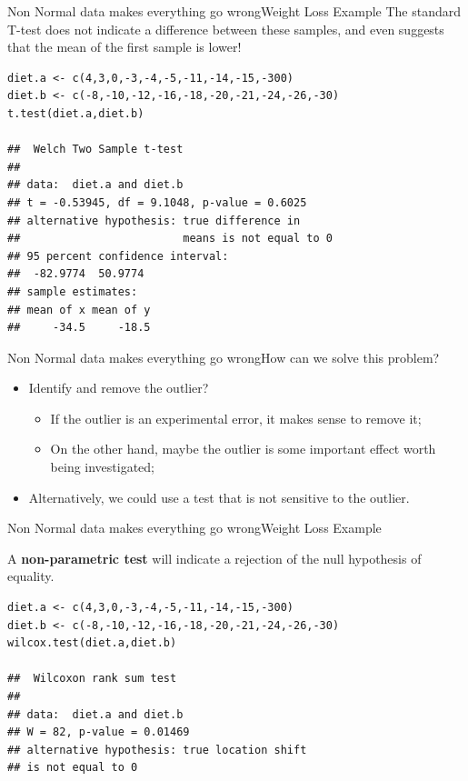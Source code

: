 \begin{frame}[fragile]{Non Normal data makes everything go wrong}{Weight Loss Example}
The standard T-test does not indicate a difference between these samples,
and even suggests that the mean of the first sample is lower!\bigskip

{\smaller
\begin{verbatim}
diet.a <- c(4,3,0,-3,-4,-5,-11,-14,-15,-300)
diet.b <- c(-8,-10,-12,-16,-18,-20,-21,-24,-26,-30)
t.test(diet.a,diet.b)

##  Welch Two Sample t-test
##
## data:  diet.a and diet.b
## t = -0.53945, df = 9.1048, p-value = 0.6025
## alternative hypothesis: true difference in
##                         means is not equal to 0
## 95 percent confidence interval:
##  -82.9774  50.9774
## sample estimates:
## mean of x mean of y
##     -34.5     -18.5
\end{verbatim}}
\end{frame}



\begin{frame}{Non Normal data makes everything go wrong}{How can we solve this problem?}

  \begin{itemize}
    \item Identify and remove the outlier?
    \begin{itemize}
      \item If the outlier is an experimental error, it makes sense to remove it;
      \item On the other hand, maybe the outlier is some important effect worth being investigated;
    \end{itemize}
    \bigskip

    \item Alternatively, we could use a test that is not sensitive to the outlier.
  \end{itemize}

\end{frame}


\begin{frame}[fragile]{Non Normal data makes everything go wrong}{Weight Loss Example}

A {\bf non-parametric test} will indicate a rejection of the null hypothesis of equality.

{\small
\begin{verbatim}
diet.a <- c(4,3,0,-3,-4,-5,-11,-14,-15,-300)
diet.b <- c(-8,-10,-12,-16,-18,-20,-21,-24,-26,-30)
wilcox.test(diet.a,diet.b)

##  Wilcoxon rank sum test
##
## data:  diet.a and diet.b
## W = 82, p-value = 0.01469
## alternative hypothesis: true location shift
## is not equal to 0
\end{verbatim}}
\end{frame}

